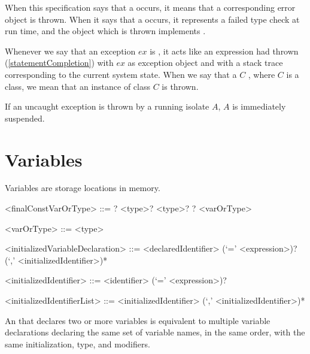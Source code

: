 \documentclass[makeidx]{article}
\begin{document}
\LMHash{}%
When this specification says that a  occurs,
it means that a corresponding error object is thrown.
When it says that a  occurs,
it represents a failed type check at run time,
and the object which is thrown implements .

\LMHash{}%
Whenever we say that an exception $ex$ is
,
it acts like an expression had thrown (\ref{statementCompletion})
with $ex$ as exception object and with a stack trace
corresponding to the current system state.
When we say that a $C$ ,
where $C$ is a class, we mean that an instance of class $C$ is thrown.

\LMHash{}%
If an uncaught exception is thrown by a running isolate $A$,
$A$ is immediately suspended.


\section{Variables}

\LMHash{}%
Variables are storage locations in memory.

\begin{grammar}
<finalConstVarOrType> ::= \LATE? \FINAL{} <type>?
  \alt \CONST{} <type>?
  \alt \LATE? <varOrType>

<varOrType> ::= \VAR{}
  \alt <type>

<initializedVariableDeclaration> ::= \gnewline{}
  <declaredIdentifier> (`=' <expression>)? (`,' <initializedIdentifier>)*

<initializedIdentifier> ::= <identifier> (`=' <expression>)?

<initializedIdentifierList> ::=
  <initializedIdentifier> (`,' <initializedIdentifier>)*
\end{grammar}

\LMHash{}%
An 
that declares two or more variables
is equivalent to multiple variable declarations declaring
the same set of variable names, in the same order,
with the same initialization, type, and modifiers.

\end{document}

